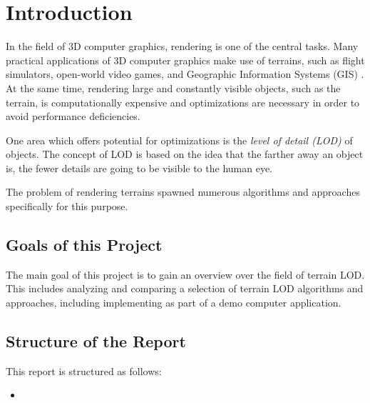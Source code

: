\chapter{Introduction}
In the field of 3D computer graphics, rendering is one of the central tasks.
Many practical applications of 3D computer graphics make use of terrains, 
such as flight simulators, open-world video games, and Geographic Information Systems (GIS) \cite[p.~185]{lodfor3dgraphics}.
At the same time, rendering large and constantly visible objects, such as the terrain, is computationally expensive 
and optimizations are necessary in order to avoid performance deficiencies.

One area which offers potential for optimizations is the \textit{level of detail (LOD)} of objects.
The concept of LOD is based on the idea that the farther away an object is, the fewer details are going to be visible to the human eye.

The problem of rendering terrains spawned numerous algorithms and approaches specifically
for this purpose. 

\section{Goals of this Project}
The main goal of this project is to gain an overview over the field of 
terrain LOD. This includes analyzing and comparing a selection of terrain LOD algorithms and approaches,
including implementing as part of a demo computer application.


\section{Structure of the Report}
This report is structured as follows:
\begin{itemize}
  \item 
\end{itemize}


